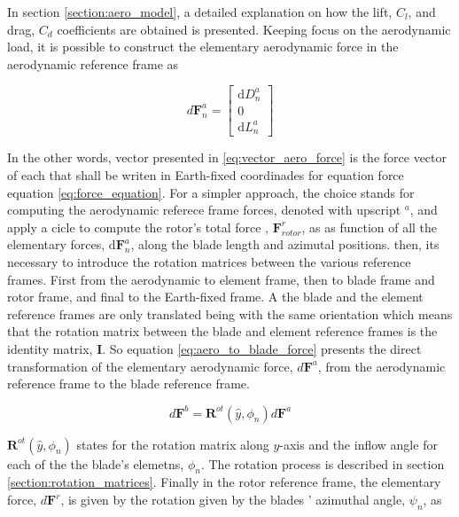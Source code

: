 In section \ref{section:aero_model}, a detailed explanation on how the lift, $C_l$, and drag, $C_d$ coefficients are obtained is presented. Keeping focus on the aerodynamic load, it is possible to construct the elementary aerodynamic force in the aerodynamic reference frame as

\begin{equation}
    d\mathbf{F}^a_n = \begin{bmatrix}
        \mathrm{d}D^a_n \\ 0 \\ \mathrm{d}L^a_n
    \end{bmatrix}
    \label{eq:vector_aero_force}
\end{equation}

In the other words, vector presented in \ref{eq:vector_aero_force} is the force vector of each that shall be writen in Earth-fixed coordinades for equation force equation \ref{eq:force_equation}. For a simpler approach, the choice stands for computing the aerodynamic referece frame forces, denoted with upscript $^a$, and apply a cicle to compute the rotor's total force , $\mathbf{F}^r_{rotor}$, as as function of all the elementary forces, $\mathrm{d}\mathbf{F}^a_n$, along the blade length and azimutal positions. then, its necessary to introduce the rotation matrices between the various reference frames. First from the aerodynamic to element frame, then to blade frame and rotor frame, and final to the Earth-fixed frame. A the blade and the element reference frames are only translated being with the same orientation which means that the rotation matrix between the blade and element reference frames is the identity matrix, $\mathbf{I}$. So equation \ref{eq:aero_to_blade_force} presents the direct transformation of the elementary aerodynamic force, $d\mathbf{F}^a$, from the aerodynamic reference frame to the blade reference frame.

\begin{equation}
    d\mathbf{F}^b = \boldsymbol{R}^{ot}(\hat{y}, \phi_n) d\mathbf{F}^a
    \label{eq:aero_to_blade_force}
\end{equation}

$\boldsymbol{R}^{ot}(\hat{y}, \phi_n)$ states for the rotation matrix along $y$-axis and the inflow angle for each of the the blade's elemetns, $\phi_n$. The rotation process is described in section \ref{section:rotation_matrices}. Finally in the rotor reference frame, the elementary force, $d\mathbf{F}^r$, is given by the rotation given by the blades ' azimuthal angle, $\psi_n$, as

